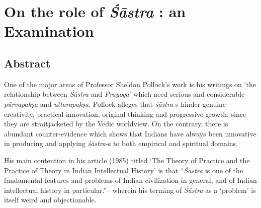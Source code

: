 \chapter{On the role of {\sl\bfseries Śāstra} : an Examination}\label{chapter9}
\vskip -10pt

\vskip -10pt

\section*{Abstract}

One of the major areas of Professor Sheldon Pollock's work is his writings on `the relationship between {\it Śāstra} and {\it Prayoga}' which need serious and considerable {\it pūrvapakṣa} and {\it uttarapakṣa}. Pollock alleges that {\it śāstra}-s hinder genuine creativity, practical innovation, original thinking and progressive growth, since they are straitjacketed by the Vedic worldview. On the contrary, there is abundant counter-evidence which shows that Indians have always been innovative in producing and applying {\it śāstra}-s to both empirical and spiritual domains. 

His main contention in his article (1985) titled `The Theory of Practice and the Practice of Theory in Indian Intellectual History' is that ``{\it Śāstra} is one of the fundamental features and problems of Indian civilization in general, and of Indian intellectual history in particular.''-- wherein his terming of {\it Śāstra} as a `problem' is itself weird and objectionable.  

